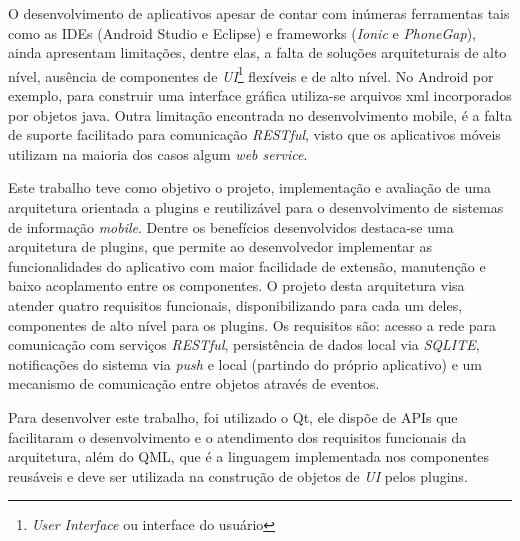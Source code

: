 O desenvolvimento de aplicativos apesar de contar com inúmeras ferramentas tais como as IDEs (Android Studio e Eclipse) e frameworks (\textit{Ionic} e \textit{PhoneGap}), ainda apresentam limitações, dentre elas, a falta de soluções arquiteturais de alto nível, ausência de componentes de \textit{UI}\footnote{\textit{User Interface} ou interface do usuário} flexíveis e de alto nível. No Android por exemplo, para construir uma interface gráfica utiliza-se arquivos xml incorporados por objetos java. Outra limitação encontrada no desenvolvimento mobile, é a falta de suporte facilitado para comunicação \textit{RESTful}, visto que os aplicativos móveis utilizam na maioria dos casos algum \textit{web service}.


Este trabalho teve como objetivo o projeto, implementação e avaliação de uma arquitetura orientada a plugins e reutilizável para o desenvolvimento de sistemas de informação \textit{mobile}. Dentre os benefícios desenvolvidos destaca-se uma arquitetura de plugins, que permite ao desenvolvedor implementar as funcionalidades do aplicativo com maior facilidade de extensão, manutenção e baixo acoplamento entre os componentes. O projeto desta arquitetura visa atender quatro requisitos funcionais, disponibilizando para cada um deles, componentes de alto nível para os plugins. Os requisitos são: acesso a rede para comunicação com serviços \textit{RESTful}, persistência de dados local via \textit{SQLITE}, notificações do sistema via \textit{push} e local (partindo do próprio aplicativo) e um mecanismo de comunicação entre objetos através de eventos.


Para desenvolver este trabalho, foi utilizado o Qt, ele dispõe de APIs que facilitaram o desenvolvimento e o atendimento dos requisitos funcionais da arquitetura, além do QML, que é a linguagem implementada nos componentes reusáveis e deve ser utilizada na construção de objetos de \textit{UI} pelos plugins.\par

